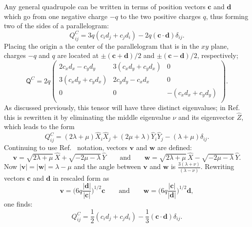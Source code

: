 Any general quadrupole can be written in terms of 
position vectors $\mathbf{c}$ and $\mathbf{d}$ which 
go from one negative charge $-q$ to the two positive charges $q$, thus forming two of the sides of a parallelogram:
\begin{equation*}
Q^C_{ij}=3q(c_i d_j + c_j d_i) -2q(\mathbf c \cdot \mathbf d) \delta_{ij} .
\end{equation*}
Placing the origin a the center of the parallelogram that is in the $xy$ plane, 
charges $-q$ and $q$ are located at
$\pm(\mathbf{c}+\mathbf{d})/2$ and $\pm(\mathbf{c}-\mathbf{d})/2$, respectively;
\begin{equation*}
\mathsf{Q}^C = 2q
\begin{pmatrix}
2c_xd_x - c_yd_y & 3(c_xd_y + c_yd_x)& 0 \\
3(c_xd_y + c_yd_x) & 2c_yd_y - c_xd_x& 0 \\
0 & 0 & -(c_xd_x+c_yd_y)\\
\end{pmatrix}  .
\end{equation*}
As discussed previously, this tensor will have three distinct eigenvalues;  
in Ref.~\cite{Torres-del-Castillo:2006uo} this is rewritten it by eliminating the middle eigenvalue $\nu$ and its eigenvector $\hat{Z}$,
which leads to the form
\begin{equation*}
Q^C_{ij}=(2\lambda+\mu) \hat{X}_i \hat{X}_j + (2\mu + \lambda) \hat{Y}_i \hat{Y}_j
-(\lambda + \mu)\delta_{ij} .
\end{equation*}
Continuing to use Ref.~\cite{Torres-del-Castillo:2006uo} notation, vectors $\mathbf{v}$ and $\mathbf{w}$ are defined:
\begin{equation*}
\mathbf{v}=\sqrt{2\lambda+\mu}\,\hat{X} +\sqrt{-2\mu-\lambda} \, \hat{Y}
\qquad \textrm{and} \qquad 
\mathbf{w}=\sqrt{2\lambda+\mu}\,\hat{X} -\sqrt{-2\mu-\lambda}\,\hat{Y}  .
\end{equation*}
Now $|\mathbf{v}|=|\mathbf{w}|=\lambda-\mu$ and the angle between $\mathbf{v}$
and $\mathbf{w}$ is $\frac{3(\lambda+\nu)}{(\lambda-\nu)}$. 
Rewriting vectors $\mathbf{c}$ and $\mathbf{d}$ in rescaled form as 
\begin{equation*}
\mathbf{v}= \Big ( 6q\frac{|\mathbf{d}|}{|\mathbf{c}|} \Big )^{1/2} \mathbf{c}
\qquad \textrm{and} \qquad  
\mathbf{w}= \Big ( 6q\frac{|\mathbf{c}|}{|\mathbf{d}|} \Big )^{1/2} \mathbf{d} ,
\end{equation*}
one finds:
\begin{equation*}
Q^C_{ij}=\frac{1}{2} (c_i d_j + c_j d_i) - \frac{1}{3}(\mathbf c \cdot \mathbf d) \delta_{ij} .
\end{equation*}

